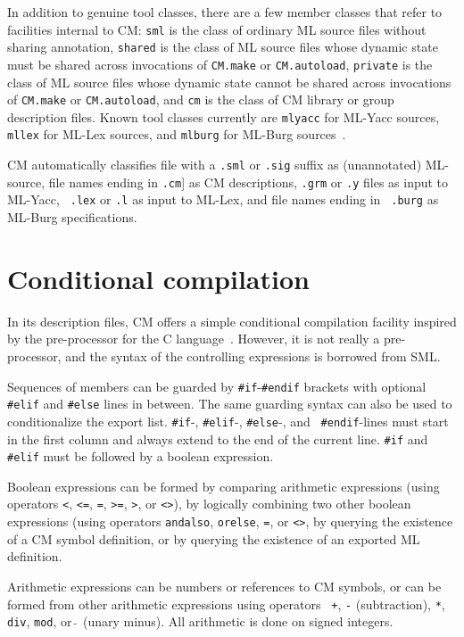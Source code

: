 \documentclass{article}
\begin{document}
In addition to genuine tool classes, there are a few member classes
that refer to facilities internal to CM: {\tt sml} is the class of
ordinary ML source files without sharing annotation, {\tt shared} is
the class of ML source files whose dynamic state must be shared across
invocations of {\tt CM.make} or {\tt CM.autoload}, {\tt private} is
the class of ML source files whose dynamic state cannot be shared
across invocations of {\tt CM.make} or {\tt CM.autoload}, and {\tt cm}
is the class of CM library or group description files.  Known tool
classes currently are {\tt mlyacc} for ML-Yacc sources, {\tt mllex}
for ML-Lex sources, and {\tt mlburg} for ML-Burg
sources~\cite{mlburg93}.

CM automatically classifies file with a {\tt .sml} or {\tt .sig} suffix
as (unannotated) ML-source, file names ending in {\tt .cm}] as CM
descriptions, {\tt .grm} or {\tt .y} files as input to ML-Yacc, {\tt
.lex} or {\tt .l} as input to ML-Lex, and file names ending in {\tt
.burg} as ML-Burg specifications.

\section{Conditional compilation}
\label{sec:preproc}

In its description files, CM offers a simple conditional
compilation facility inspired by the pre-processor for the C
language~\cite{k&r2}.  However, it is not really a pre-processor, and
the syntax of the controlling expressions is borrowed from SML.

Sequences of members can be guarded by {\tt \#if}-{\tt \#endif}
brackets with optional {\tt \#elif} and {\tt \#else} lines in between.
The same guarding syntax can also be used to conditionalize the export
list.  {\tt \#if}-, {\tt \#elif}-, {\tt \#else}-, and {\tt
\#endif}-lines must start in the first column and always
extend to the end of the current line.  {\tt \#if} and {\tt \#elif}
must be followed by a boolean expression.

Boolean expressions can be formed by comparing arithmetic expressions
(using operators {\tt <}, {\tt <=}, {\tt =}, {\tt >=}, {\tt >}, or
{\tt <>}), by logically combining two other boolean expressions (using
operators {\tt andalso}, {\tt orelse}, {\tt =}, or {\tt <>}, by
querying the existence of a CM symbol definition, or by querying the
existence of an exported ML definition.

Arithmetic expressions can be numbers or references to CM symbols, or
can be formed from other arithmetic expressions using operators {\tt
+}, {\tt -} (subtraction), \verb|*|, {\tt div}, {\tt mod}, or $\tilde{~}$
(unary minus).  All arithmetic is done on signed integers.
\end{document}
